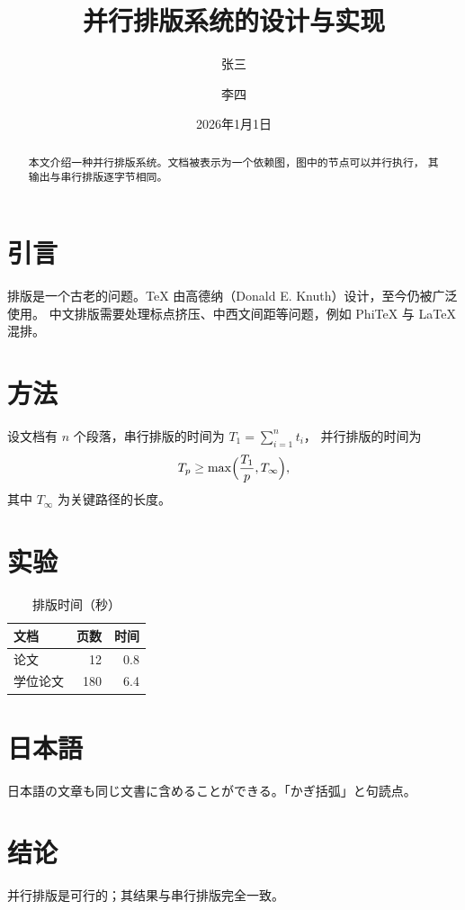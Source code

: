 \documentclass[UTF8,fontset=fandol,zihao=-4]{ctexart}
\title{并行排版系统的设计与实现}
\author{张三 \and 李四}
\date{2026年1月1日}
\newcommand{\jp}{\CJKfamily{jp}}
\begin{document}
\maketitle
\begin{abstract}
本文介绍一种并行排版系统。文档被表示为一个依赖图，图中的节点可以并行执行，
其输出与串行排版逐字节相同。
\end{abstract}
\section{引言}
排版是一个古老的问题。\TeX{} 由高德纳（Donald E. Knuth）设计，至今仍被广泛使用。
中文排版需要处理标点挤压、中西文间距等问题，例如 PhiTeX 与 \LaTeX{} 混排。
\section{方法}
设文档有 $n$ 个段落，串行排版的时间为 $T_1 = \sum_{i=1}^{n} t_i$，
并行排版的时间为
\begin{equation}
  T_p \ge \max\Bigl(\frac{T_1}{p}, T_\infty\Bigr),
\end{equation}
其中 $T_\infty$ 为关键路径的长度。
\section{实验}
\begin{table}[h]
\centering
\caption{排版时间（秒）}
\begin{tabular}{lrr}
\toprule
文档 & 页数 & 时间 \\
\midrule
论文 & 12 & 0.8 \\
学位论文 & 180 & 6.4 \\
\bottomrule
\end{tabular}
\end{table}
\section{日本語}
{\jp 日本語の文章も同じ文書に含めることができる。「かぎ括弧」と句読点。}
\section{结论}
并行排版是可行的；其结果与串行排版完全一致。
\end{document}
